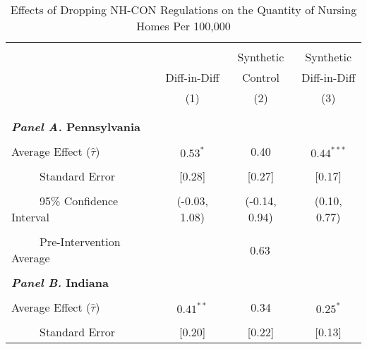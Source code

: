 \documentclass[../Main.tex]{subfiles}
\begin{document}
\newpage
\null
\vfill
\begin{table}[htbp]\centering \footnotesize
\def\sym#1{\ifmmode^{#1}\else\(^{#1}\)\fi}
\captionsetup{width=.75\textwidth}
\caption{\centering Effects of Dropping NH-CON Regulations on the Quantity of Nursing Homes Per 100,000}
\label{tab:ave_results_q_nh_nobord_nocov}
\setlength{\tabcolsep}{10pt}
\begin{tabular}{l*{3}{c}}
\hline\hline
\\[-2ex]
&\multicolumn{1}{c}{}&\multicolumn{1}{c}{Synthetic}&\multicolumn{1}{c}{Synthetic}\\
&\multicolumn{1}{c}{Diff-in-Diff}&\multicolumn{1}{c}{Control}&\multicolumn{1}{c}{Diff-in-Diff}\\
&\multicolumn{1}{c}{(1)}&\multicolumn{1}{c}{(2)}&\multicolumn{1}{c}{(3)}\\
\\[-2ex]
\hline
\\[-.1ex]
\multicolumn{4}{l}{\textbf{\textit{Panel A.} Pennsylvania}}\\
\\[-1.5ex]
\multicolumn{1}{l}{Average Effect ($\hat{\tau}$)}&   \multicolumn{1}{c}{$0.53^{*}$}&   \multicolumn{1}{c}{0.40}&  \multicolumn{1}{c}{$0.44^{***}$}\\
\\[-2ex]
\multicolumn{1}{l}{\ \ \ \ \ Standard Error}  &\multicolumn{1}{c}{[0.28]}&\multicolumn{1}{c}{[0.27]}&\multicolumn{1}{c}{[0.17]}\\
\\[-2ex]
\multicolumn{1}{l}{\ \ \ \ \ 95\% Confidence Interval}&   \multicolumn{1}{c}{(-0.03, 1.08)}&   \multicolumn{1}{c}{(-0.14, 0.94)}&   \multicolumn{1}{c}{(0.10, 0.77)}\\
\\[-2ex]
\multicolumn{1}{l}{\ \ \ \ \ Pre-Intervention Average}&   \multicolumn{3}{c}{0.63}\\
\\[-.1ex]
\multicolumn{4}{l}{\textbf{\textit{Panel B.} Indiana}}\\
\\[-1.5ex]
\multicolumn{1}{l}{Average Effect ($\hat{\tau}$)}&   \multicolumn{1}{c}{$0.41^{**}$}&   \multicolumn{1}{c}{0.34} &  \multicolumn{1}{c}{$0.25^{*}$}\\
\\[-2ex]
\multicolumn{1}{l}{\ \ \ \ \ Standard Error}  &\multicolumn{1}{c}{[0.20]}&\multicolumn{1}{c}{[0.22]}&\multicolumn{1}{c}{[0.13]}\\

\end{tabular}
\end{table}
\end{document}
